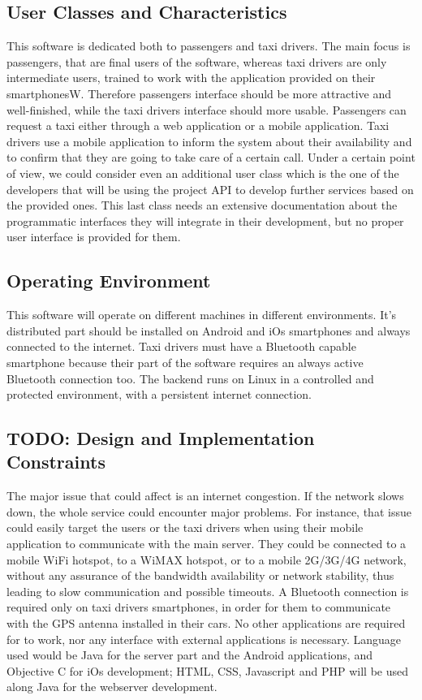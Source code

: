 \subsection{User Classes and Characteristics}
This software is dedicated both to passengers and taxi drivers.
The main focus is passengers, that are final users of the software, whereas taxi drivers are only intermediate users, trained to work with the application provided on their smartphonesW.
Therefore passengers interface should be more attractive and well-finished, while the taxi drivers interface should more usable.
Passengers can request a taxi either through a web application or a mobile application.
Taxi drivers use a mobile application to inform the system about their availability and to confirm that they are going to take care of a certain call.
Under a certain point of view, we could consider even an additional user class which is the one of the developers that will be using the project API to develop further services based on the provided ones.
This last class needs an extensive documentation about the programmatic interfaces they will integrate in their development, but no proper user interface is provided for them.
\subsection{Operating Environment}
This software will operate on different machines in different environments. It's distributed part should be installed on Android and iOs smartphones and always connected to the internet. Taxi drivers must have a Bluetooth capable smartphone because their part of the software requires an always active Bluetooth connection too.
The backend runs on Linux in a controlled and protected environment, with a persistent internet connection.
\subsection{TODO: Design and Implementation Constraints}
The major issue that could affect \myTaxiService{} is an internet congestion. If the network slows down, the whole service could encounter major problems.
For instance, that issue could easily target the users or the taxi drivers when using their mobile application to communicate with the main server.
They could be connected to a mobile WiFi hotspot, to a WiMAX hotspot, or to a mobile 2G/3G/4G network, without any assurance of the bandwidth availability or network stability, thus leading to slow communication and possible timeouts.
A Bluetooth connection is required only on taxi drivers smartphones, in order for them to communicate with the GPS antenna installed in their cars.
No other applications are required for \myTaxiService{} to work, nor any interface with external applications is necessary.
Language used would be Java for the server part and the Android applications, and Objective C for iOs development; HTML, CSS, Javascript and PHP will be used along Java for the webserver development.

